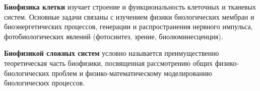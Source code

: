 \documentclass[12pt,a4paper,oneside]{book}
\begin{document}

{\bf Биофизика клетки} изучает строение и функциональность клеточных и тканевых систем. Основные задачи связаны с изучением физики биологических мембран и биоэнергетических процессов, генерации и распространения нервного импульса, фотобиологических явлений (фотосинтез, зрение, биолюминесценция).

{\bf Биофизикой сложных систем}  условно называется преимущественно теоретическая часть биофизики, посвященная рассмотрению общих физико-биологических проблем и физико-математическому моделированию биологических процессов.


\end{document}

